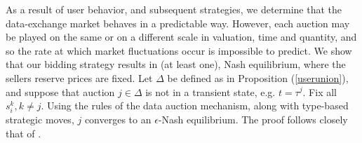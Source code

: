 As a result of user behavior, and subsequent strategies, we determine that the data-exchange market behaves in a predictable way. However,
each auction may be played on the same or on a different scale in
valuation, time and quantity, and so the rate at which market fluctuations occur is impossible to predict. 
We show that our bidding strategy results in (at least one), Nash equilibrium, where the sellers reserve prices are fixed. 
{
Let $\Delta$ be defined as in Proposition (\ref{userunion}), and suppose that auction $j\in\Delta$ is not in a transient state, e.g. $t = \tau^j$. Fix all $s_i^k, k\ne j$. Using the rules of the data auction mechanism, along with type-based strategic moves, $j$ converges to an $\epsilon$-Nash equilibrium. The proof follows closely that of \cite{semret}.
}
\\

